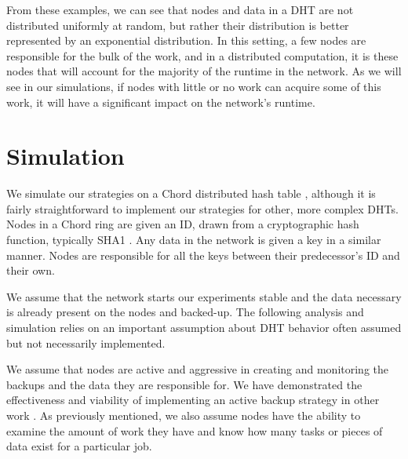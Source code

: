 \documentclass[11pt,letterpaper]{article}
\begin{document}
From these examples, we can see that nodes and data in a DHT are not distributed uniformly at random, but rather their distribution is better represented by  an exponential distribution.
In this setting, a few nodes are responsible for the bulk of the work, and in a distributed computation, it is these nodes that will account for the majority of the runtime in the network.
As we will see in our simulations, if nodes with little or no work can acquire some of this work, it will have a significant impact on the network's runtime.



\section{Simulation}
\label{sec:auto-simulation}



We simulate our strategies on a Chord distributed hash table \cite{chord}, although it is fairly straightforward to implement our strategies for other, more complex DHTs.
Nodes in a Chord ring are given an ID, drawn from a cryptographic hash function, typically SHA1 \cite{sha1}.
Any data in the network is given a key in a similar manner.
Nodes are responsible for all the keys between their predecessor's ID and their own.

We assume that the network starts our experiments stable and the data necessary is already present on the nodes and backed-up.
The following analysis and simulation relies on an important assumption about DHT behavior often assumed but not necessarily implemented.


We assume that nodes are active and aggressive in creating and monitoring the backups and the data they are responsible for.
We have demonstrated the effectiveness and viability of implementing an active backup strategy in other work \cite{chordreduce} \cite{urdht}.
As previously mentioned, we also assume nodes have the ability to examine the amount of work they have and know how many tasks or pieces of data exist for a particular job.
\end{document}
